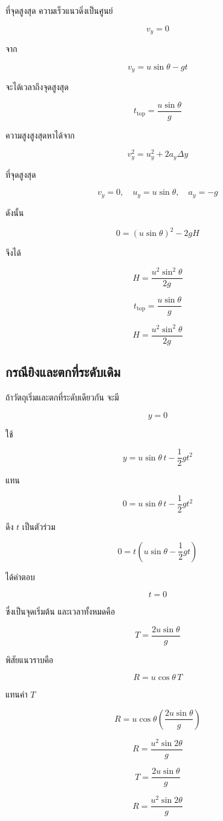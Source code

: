 ที่จุดสูงสุด ความเร็วแนวดิ่งเป็นศูนย์

\[
v_y=0
\]

จาก

\[
v_y=u\sin\theta-gt
\]

จะได้เวลาถึงจุดสูงสุด

\[
t_{\text{top}}=\frac{u\sin\theta}{g}
\]

ความสูงสูงสุดหาได้จาก

\[
v_y^2=u_y^2+2a_y\Delta y
\]

ที่จุดสูงสุด

\[
v_y=0,\quad u_y=u\sin\theta,\quad a_y=-g
\]

ดังนั้น

\[
0=(u\sin\theta)^2-2gH
\]

จึงได้

\[
H=\frac{u^2\sin^2\theta}{2g}
\]

\begin{tcolorbox}[title=จุดสูงสุด]
\[
t_{\text{top}}=\frac{u\sin\theta}{g}
\]

\[
H=\frac{u^2\sin^2\theta}{2g}
\]
\end{tcolorbox}

\subsection{กรณียิงและตกที่ระดับเดิม}

ถ้าวัตถุเริ่มและตกที่ระดับเดียวกัน จะมี

\[
y=0
\]

ใช้

\[
y=u\sin\theta\,t-\frac{1}{2}gt^2
\]

แทน

\[
0=u\sin\theta\,t-\frac{1}{2}gt^2
\]

ดึง $t$ เป็นตัวร่วม

\[
0=t\left(u\sin\theta-\frac{1}{2}gt\right)
\]

ได้คำตอบ

\[
t=0
\]

ซึ่งเป็นจุดเริ่มต้น และเวลาทั้งหมดคือ

\[
T=\frac{2u\sin\theta}{g}
\]

พิสัยแนวราบคือ

\[
R=u\cos\theta\,T
\]

แทนค่า $T$

\[
R=u\cos\theta\left(\frac{2u\sin\theta}{g}\right)
\]

\[
R=\frac{u^2\sin2\theta}{g}
\]

\begin{tcolorbox}[title=กรณียิงและตกที่ระดับเดิม]
\[
T=\frac{2u\sin\theta}{g}
\]

\[
R=\frac{u^2\sin2\theta}{g}
\]
\end{tcolorbox}

